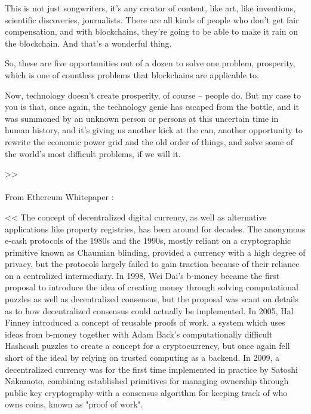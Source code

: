 \documentclass[a4paper]{article}
\begin{document}
This is not just songwriters, it's any creator of content, like art, like inventions, scientific discoveries, journalists. There are all kinds of people who don't get fair compensation, and with blockchains, they're going to be able to make it rain on the blockchain. And that's a wonderful thing.

So, these are five opportunities out of a dozen to solve one problem, prosperity, which is one of countless problems that blockchains are applicable to.


Now, technology doesn't create prosperity, of course -- people do. But my case to you is that, once again, the technology genie has escaped from the bottle, and it was summoned by an unknown person or persons at this uncertain time in human history, and it's giving us another kick at the can, another opportunity to rewrite the economic power grid and the old order of things, and solve some of the world's most difficult problems, if we will it.

>>
\\\\
From Ethereum Whitepaper : 

<<
The concept of decentralized digital currency, as well as alternative applications like property registries, has been around for decades. The anonymous e-cash protocols of the 1980s and the 1990s, mostly reliant on a cryptographic primitive known as Chaumian blinding, provided a currency with a high degree of privacy, but the protocols largely failed to gain traction because of their reliance on a centralized intermediary. In 1998, Wei Dai's b-money became the first proposal to introduce the idea of creating money through solving computational puzzles as well as decentralized consensus, but the proposal was scant on details as to how decentralized consensus could actually be implemented. In 2005, Hal Finney introduced a concept of reusable proofs of work, a system which uses ideas from b-money together with Adam Back's computationally difficult Hashcash puzzles to create a concept for a cryptocurrency, but once again fell short of the ideal by relying on trusted computing as a backend. In 2009, a decentralized currency was for the first time implemented in practice by Satoshi Nakamoto, combining established primitives for managing ownership through public key cryptography with a consensus algorithm for keeping track of who owns coins, known as "proof of work".
\end{document}
